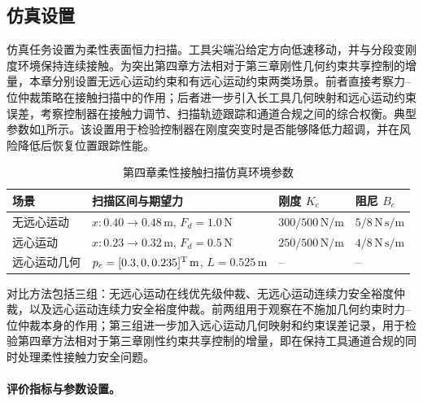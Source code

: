 \subsection{仿真设置}
\label{subsec:ch4_sim_task}

仿真任务设置为柔性表面恒力扫描。工具尖端沿给定方向低速移动，并与分段变刚度环境保持连续接触。为突出第四章方法相对于第三章刚性几何约束共享控制的增量，本章分别设置无远心运动约束和有远心运动约束两类场景。前者直接考察力--位仲裁策略在接触扫描中的作用；后者进一步引入长工具几何映射和远心运动约束误差，考察控制器在接触力调节、扫描轨迹跟踪和通道合规之间的综合权衡。典型参数如\cref{tab:ch4_env_params}所示。该设置用于检验控制器在刚度突变时是否能够降低力超调，并在风险降低后恢复位置跟踪性能。

\begin{table}[H]
\centering
\caption{第四章柔性接触扫描仿真环境参数}
\label{tab:ch4_env_params}
\begin{tabular}{llll}
\toprule
场景 & 扫描区间与期望力 & 刚度 $K_e$ & 阻尼 $B_e$ \\
\midrule
无远心运动 & $x:0.40\to0.48\,\mathrm{m}$, $F_d=1.0\,\mathrm{N}$ & $300/500\,\mathrm{N/m}$ & $5/8\,\mathrm{N\,s/m}$ \\
远心运动 & $x:0.23\to0.32\,\mathrm{m}$, $F_d=0.5\,\mathrm{N}$ & $250/500\,\mathrm{N/m}$ & $4/8\,\mathrm{N\,s/m}$ \\
远心运动几何 & $p_c=[0.3,0,0.235]^{\mathrm{T}}\,\mathrm{m}$, $L=0.525\,\mathrm{m}$ & -- & -- \\
\bottomrule
\end{tabular}
\end{table}

对比方法包括三组：无远心运动在线优先级仲裁、无远心运动连续力安全裕度仲裁，以及远心运动连续力安全裕度仲裁。前两组用于观察在不施加几何约束时力--位仲裁本身的作用；第三组进一步加入远心运动几何映射和约束误差记录，用于检验第四章方法相对于第三章刚性约束共享控制的增量，即在保持工具通道合规的同时处理柔性接触力安全问题。

\paragraph{评价指标与参数设置。}
\label{subsec:ch4_metrics}

